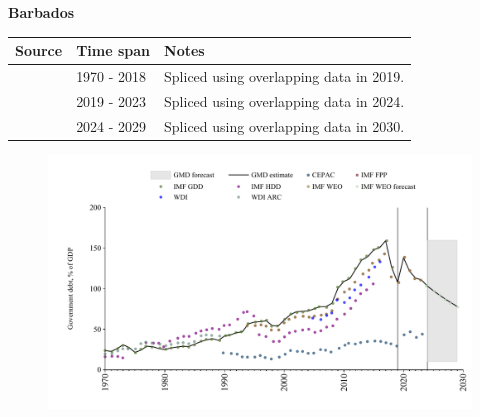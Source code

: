 \documentclass[12pt,a4paper,landscape]{article}
\begin{document}
\begin{adjustbox}{max totalsize={\paperwidth}{\paperheight},center}
\begin{minipage}[t][\textheight][t]{\textwidth}
\vspace*{0.5cm}
{}
\begin{center}
{\Large\bfseries Barbados}
\end{center}
\vspace{0.5cm}
\begin{table}[H]
\centering
\small
\begin{tabular}{|l|l|l|}
\hline
\textbf{Source} & \textbf{Time span} & \textbf{Notes} \\
\hline
\rowcolor{white}\cite{IMF_GDD}& 1970 - 2018 &Spliced using overlapping data in 2019.\\
\rowcolor{lightgray}\cite{IMF_FPP}& 2019 - 2023 &Spliced using overlapping data in 2024.\\
\rowcolor{white}\cite{IMF_WEO_forecast}& 2024 - 2029 &Spliced using overlapping data in 2030.\\
\hline
\end{tabular}
\end{table}
\begin{figure}[H]
\centering
\includegraphics[width=\textwidth,height=0.6\textheight,keepaspectratio]{graphs/BRB_govdebt_GDP.pdf}
\end{figure}
\end{minipage}
\end{adjustbox}
\end{document}
